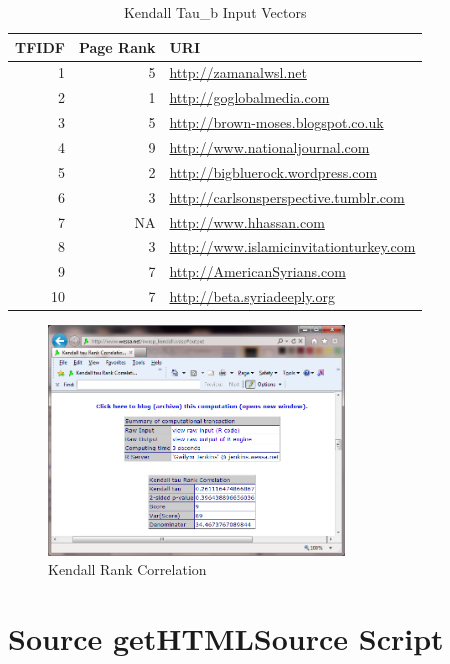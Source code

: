 \documentclass[letterpaper,11pt]{report}
\begin{document}
\begin{savenotes}
\begin{table}
	\centering
    \begin{tabular}{|r|r|l|}
    \hline
    TFIDF 	& Page Rank     & URI                            \\ \hline
    1				& 5 	& \url{http://zamanalwsl.net}                 \\ \hline
    2				& 1 	& \url{http://goglobalmedia.com}              \\ \hline
    3				& 5 	& \url{http://brown-moses.blogspot.co.uk}     \\ \hline		
    4				& 9 	& \url{http://www.nationaljournal.com}        \\ \hline
    5				& 2 	& \url{http://bigbluerock.wordpress.com}      \\ \hline						
    6				& 3 	& \url{http://carlsonsperspective.tumblr.com} \\ \hline
    7				& NA 	& \url{http://www.hhassan.com}                \\ \hline
    8				& 3 	& \url{http://www.islamicinvitationturkey.com} \\ \hline				
	  9				& 7 	& \url{http://AmericanSyrians.com}            \\ \hline
		10			& 7 	& \url{http://beta.syriadeeply.org}           \\ \hline
    \end{tabular}
    \caption {Kendall Tau\_b Input Vectors}
			\label{tab:Kendall}
\end{table}


\begin{figure}[htbp]
	\centering
		\includegraphics[width=0.70\textwidth]{Kendall.png}
	\caption{Kendall Rank Correlation}
	\label{fig:Kendall}
\end{figure}


\end{savenotes}




\appendix
{}

\chapter{Source getHTMLSource Script} \label{chap:getHTML}

\end{document}
